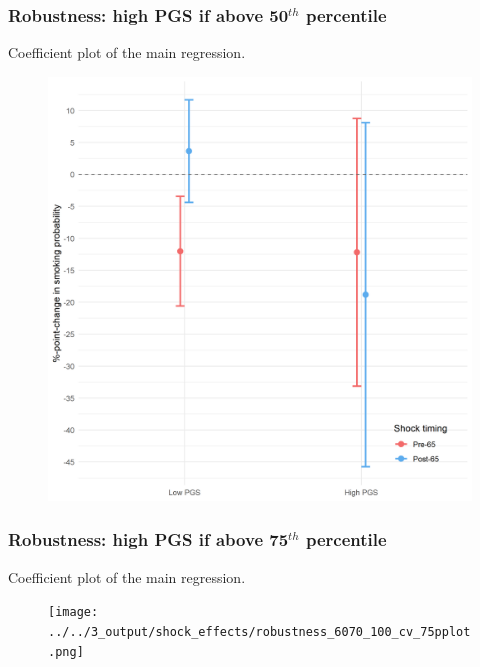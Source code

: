 \documentclass[10pt,compress,xcolor=dvipsnames]{beamer}    %
\newcounter{ex}
\newcommand{\1}[1]{\mathrm{1\hspace*{-2.5pt}l}[#1]}	%
\begin{document}
\begin{frame}
\frametitle{Robustness: high PGS if above 50$^{th}$ percentile}
Coefficient plot of the main regression.
\begin{figure}[hbtp]
\centering
\includegraphics[height=0.8\textheight]{../../3_output/shock_effects/robustness_6070__50pt_cvplot.png}
\label{fig:coeffplot50highPGS}
\end{figure}
\hyperlink{frame:robustness}{}
\end{frame}

\begin{frame}
\frametitle{Robustness: high PGS if above 75$^{th}$ percentile}
Coefficient plot of the main regression.
\begin{figure}[hbtp]
\centering
\texttt{[image: ../../3\_output/shock\_effects/robustness\_6070\_100\_cv\_75pplot.png]}
\label{fig:coeffplot75highPGS}
\end{figure}
\hyperlink{frame:robustness}{}
\end{frame}
\end{document}

